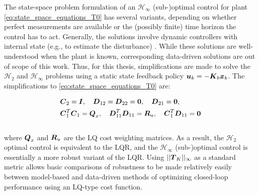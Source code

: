 The state-space problem formulation of an $\mathcal{H}_{\infty}$ (sub-)optimal control for plant \eqref{eq:state_space_equations_T0} has several variants, depending on whether perfect measurements are available or the (possibly finite) time horizon the control has to act.  Generally, the solutions involve dynamic controllers with internal state (e.g., to estimate the disturbance) \cite{basar1989dynamic, bacsar2008h}.  While these solutions are well-understood when the plant is known, corresponding data-driven solutions are out of scope of this work.  Thus, for this thesis, simplifications are made to solve the $\mathcal{H}_{2}$ and $\mathcal{H}_{\infty}$ problems using a static state feedback policy $\vb*{u}_{k} = -\vb*{K}_{b}\vb*{x}_{k}$.  The simplifications to \eqref{eq:state_space_equations_T0} are:

\begin{equation}
\label{eq:lq_performance}
\begin{aligned}
	&\vb*{C}_{2} = \vb*{I}, \hspace{10pt}
	\vb*{D}_{12} = \vb*{D}_{22} = \vb*{0}, \hspace{10pt}
	\vb*{D}_{21} = \vb*{0},\\
	&\vb*{C}_{1}^{T}\vb*{C}_{1} =  \vb*{Q}_{x}, \hspace{10pt}
	\vb*{D}_{11}^{T}\vb*{D}_{11} = \vb*{R}_{u}, \hspace{10pt}
	\vb*{C}_{1}^{T} \vb*{D}_{11} = \vb*{0}
\end{aligned}
\end{equation}\\
where $\vb*{Q}_{x}$ and $\vb*{R}_{u}$ are the LQ cost weighting matrices.  As a result, the $\mathcal{H}_{2}$ optimal control is equivalent to the LQR, and the $\mathcal{H}_{\infty}$ (sub-)optimal control is essentially a more robust variant of the LQR.  Using $||\vb*{T}_{K}||_{\infty}$ as a standard metric allows basic comparisons of robustness to be made relatively easily between model-based and data-driven methods of optimizing closed-loop performance using an LQ-type cost function.

